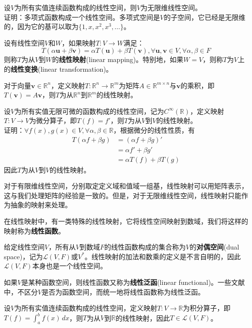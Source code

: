 \begin{example}
    设$V$为所有实值连续函数构成的线性空间，则$V$为无限维线性空间。\\
    证明：多项式函数构成一个线性空间。多项式空间是$V$的子空间，它已经是无限维的，因为它的基可以取为$\{1,x,x^2,x^3,\ldots\}$。
\end{example}

\begin{definition}[线性映射]
    设有线性空间$V$和$W$，如果映射$T:V\to W$满足：
    \[T(\alpha \mathbf{u}+\beta \mathbf{v})=\alpha T(\mathbf{u})+\beta T(\mathbf{v}),\forall \mathbf{u},\mathbf{v}\in V,\forall \alpha,\beta\in F\]
    则称$T$为从$V$到$W$的\textbf{线性映射}(linear mapping)。特别地，如果$W=V$，则称$T$为$V$上的\textbf{线性变换}(linear transformation)。
\end{definition}

\begin{example}
    对于向量$\mathbf{v}\in\mathbb{R}^n$，定义映射$T:\mathbb{R}^n\to\mathbb{R}^m$为矩阵$A\in\mathbb{R}^{m\times n}$与$\mathbf{v}$的乘积，即$T(\mathbf{v})=A\mathbf{v}$，则$T$为从$\mathbb{R}^n$到$\mathbb{R}^m$的线性映射。
\end{example}

\begin{example}
    设$V$为所有实值无限可微的函数构成的线性空间，记为$C^\infty(\mathbb{R})$，定义映射$T:V\to V$为微分算子，即$T(f)=f'$，则$T$为从$V$到$V$的线性映射。\\
    证明：$\forall f(x),g(x)\in V,\forall \alpha,\beta\in \mathbb{R}$，根据微分的线性性质，有
    \begin{align*}
        T(\alpha f+\beta g)&=(\alpha f+\beta g)'\\
        &=\alpha f'+\beta g'\\
        &=\alpha T(f)+\beta T(g)
    \end{align*}
    因此$T$为从$V$到$V$的线性映射。
\end{example}

对于有限维线性空间，分别取定定义域和值域一组基，线性映射可以用矩阵表示，这与我们处理矩阵的经验是一致的。但是，对于无限维线性空间，线性映射只能作为抽象的映射来处理。

在线性映射中，有一类特殊的线性映射，它将线性空间映射到数域，我们将这样的映射称为\textbf{线性函数}。

\begin{definition}[对偶空间]
    给定线性空间$V$，所有从$V$到数域$F$的线性函数构成的集合称为$V$的\textbf{对偶空间}(dual space)，记为$\mathcal{L} (V,F)$或$V^*$。线性映射的加法和数乘的定义是不言自明的，因此$\mathcal{L} (V,F)$本身也是一个线性空间。

    如果$V$是某种函数空间，则线性函数又称为\textbf{线性泛函}(linear functional)。一些文献中，不区分$V$是否为函数空间，而统一地将线性函数称为线性泛函。
\end{definition}
\begin{example}
    设$V$为所有实值连续函数构成的线性空间，定义映射$T:V\to \mathbb{R}$为积分算子，即$T(f)=\int_{a}^{b}f(x)\,dx$，则$T$为从$V$到$\mathbb{R}$的线性映射，因此$T\in \mathcal{L} (V,F)$。
\end{example}

